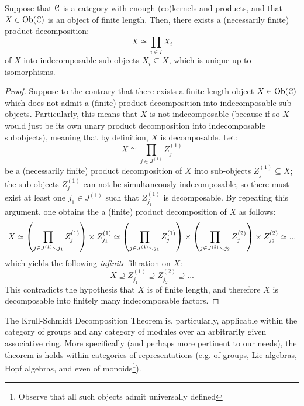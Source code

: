             \begin{theorem} \label{theorem: krull_schmidt_theorem}
                Suppose that $\mathcal{C}$ is a category with enough (co)kernels and products, and that $X \in \mathrm{Ob}(\mathcal{C})$ is an object of finite length. Then, there exists a (necessarily finite) product decomposition:
                    $$X \cong \prod_{i \in I} X_i$$
                of $X$ into indecomposable sub-objects $X_i \subseteq X$, which is unique up to isomorphisms.
            \end{theorem}
                \begin{proof}
                    Suppose to the contrary that there exists a finite-length object $X \in \mathrm{Ob}(\mathcal{C})$ which does not admit a (finite) product decomposition into indecomposable sub-objects. Particularly, this means that $X$ is not indecomposable (because if so $X$ would just be its own unary product decomposition into indecomposable subobjects), meaning that by definition, $X$ is decomposable. Let:
                        $$X \cong \prod_{j \in J^{(1)}} Z_j^{(1)}$$
                    be a (necessarily finite) product decomposition of $X$ into sub-objects $Z_j^{(1)} \subseteq X$; the sub-objects $Z_j^{(1)}$ can not be simultaneously indecomposable, so there must exist at least one $j_1 \in J^{(1)}$ such that $Z_{j_1}^{(1)}$ is decomposable. By repeating this argument, one obtains the a (finite) product decomposition of $X$ as follows:
                        $$X \cong \left( \prod_{j \in J^{(1)} \setminus j_1} Z_j^{(1)} \right) \x Z_{j_1}^{(1)} \cong \left( \prod_{j \in J^{(1)} \setminus j_1} Z_j^{(1)} \right) \x \left( \prod_{j \in J^{(2)} \setminus j_2} Z_j^{(2)} \right) \x Z_{j_2}^{(2)} \cong ...$$
                    which yields the following \textit{infinite} filtration on $X$:
                        $$X \supseteq Z_{j_1}^{(1)} \supseteq Z_{j_2}^{(2)} \supseteq ...$$
                    This contradicts the hypothesis that $X$ is of finite length, and therefore $X$ is decomposable into finitely many indecomposable factors.
                \end{proof}
            \begin{example}
                The Krull-Schmidt Decomposition Theorem is, particularly, applicable within the category of groups and any category of modules over an arbitrarily given associative ring. More specifically (and perhaps more pertinent to our needs), the theorem is holds within categories of representations (e.g. of groups, Lie algebras, Hopf algebras, and even of monoids\footnote{Observe that all such objects admit universally defined }). 
            \end{example}

